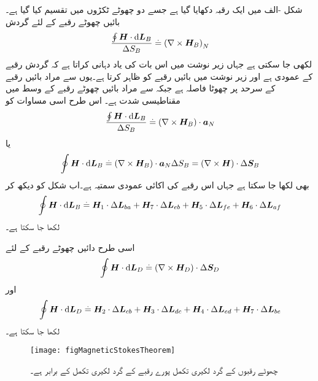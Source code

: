 شکل -الف میں ایک رقبہ دکھایا گیا ہے جسے دو چھوٹے ٹکڑوں میں تقسیم کیا گیا ہے۔بائیں چھوٹے رقبے کے لئے گردش
\begin{align*}
\frac{\oint \kvec{H} \cdot \dif \kvec{L}_B}{\Delta S_B} \overset{.}{=} \left(\nabla \times \kvec{H}_B \right)_N
\end{align*}
لکھی جا سکتی ہے جہاں زیر نوشت میں  اس بات کی یاد دہانی کراتا ہے کہ گردش رقبے  کے عمودی ہے اور زیر نوشت میں  بائیں رقبے کو ظاہر کرتا ہے۔یوں  سے مراد بائیں رقبے کے سرحد پر چھوٹا فاصلہ ہے جبکہ  سے مراد بائیں چھوٹے رقبے کے وسط میں مقناطیسی شدت ہے۔ اس طرح اسی مساوات  کو
\begin{align*}
\frac{\oint \kvec{H} \cdot \dif \kvec{L}_B}{\Delta S_B} \overset{.}{=} \left(\nabla \times \kvec{H}_B \right) \cdot \aN
\end{align*}
یا
\begin{align*}
\oint \kvec{H} \cdot \dif \kvec{L}_B\overset{.}{=} \left(\nabla \times \kvec{H}_B \right) \cdot \aN \Delta S_B=\left(\nabla \times \kvec{H} \right) \cdot  \Delta \kvec{S}_B
\end{align*}
بھی لکھا جا سکتا ہے جہاں  اس رقبے کی اکائی عمودی سمتیہ ہے۔اب شکل کو دیکھ کر
\begin{align*}
\oint \kvec{H} \cdot \dif \kvec{L}_B\overset{.}{=} \kvec{H}_1 \cdot \Delta \kvec{L}_{ba}+ \kvec{H}_7 \cdot \Delta\kvec{L}_{eb}+ \kvec{H}_5 \cdot \Delta \kvec{L}_{fe}+ \kvec{H}_6 \cdot \Delta \kvec{L}_{af}
\end{align*}
لکھا جا سکتا ہے۔ 

اسی طرح دائیں چھوٹے رقبے کے لئے
\begin{align*}
\oint \kvec{H} \cdot \dif \kvec{L}_D\overset{.}{=}\left(\nabla \times \kvec{H}_D \right) \cdot  \Delta \kvec{S}_D
\end{align*}
اور
\begin{align*}
\oint \kvec{H} \cdot \dif \kvec{L}_D\overset{.}{=} \kvec{H}_2 \cdot \Delta\kvec{L}_{cb}+ \kvec{H}_3 \cdot \Delta\kvec{L}_{dc}+ \kvec{H}_4 \cdot \Delta\kvec{L}_{ed}+ \kvec{H}_7 \cdot \Delta\kvec{L}_{be}
\end{align*}
لکھا جا سکتا ہے۔

\begin{figure}
\centering
\texttt{[image: figMagneticStokesTheorem]}
\caption{چھوٹے رقبوں کے گرد لکیری تکمل پورے رقبے کے گرد لکیری تکمل کے برابر ہے۔}
\label{شکل_مقناطیسی_مسئلہ_سٹوکس}
\end{figure}

